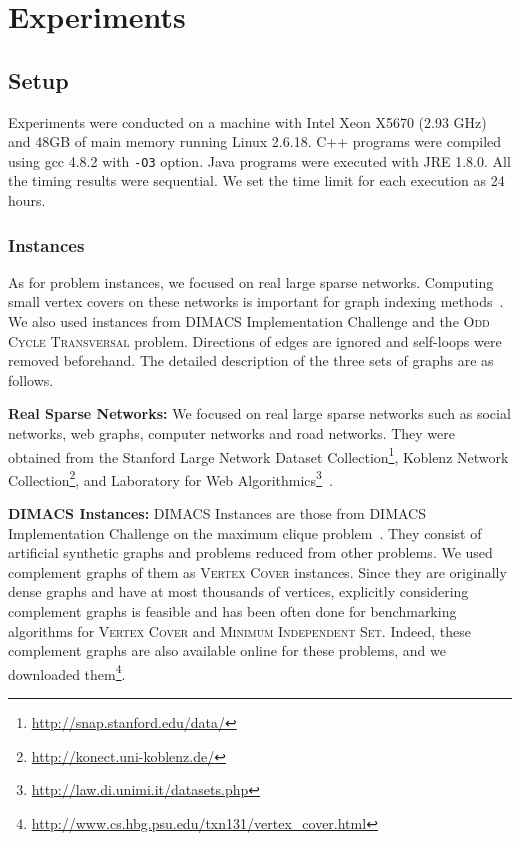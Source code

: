 \documentclass[11pt]{article}
\newcommand{\OCT}{\textsc{Odd Cycle Transversal}\xspace}
\newcommand{\myparagraph}[1]{\vspace{1em}\noindent\textbf{#1:}}
\begin{document}
 \section{Experiments}\label{sec:experiments}
\subsection{Setup}
Experiments were conducted on a machine with Intel
Xeon X5670 (2.93 GHz) and 48GB of main memory
running Linux 2.6.18.
C++ programs were compiled using gcc 4.8.2 with \texttt{-O3} option.
Java programs were executed with JRE 1.8.0.
All the timing results were sequential.
We set the time limit for each execution as 24 hours.


\subsubsection{Instances}
As for problem instances, we focused on real large sparse networks.
Computing small vertex covers on these networks
is important for graph indexing methods~\cite{app/vc_index,app/k-path}.
We also used instances from DIMACS Implementation Challenge and the \OCT problem.
Directions of edges are ignored and self-loops were removed beforehand.
The detailed description of the three sets of graphs are as follows.

\myparagraph{Real Sparse Networks} We focused on real large sparse networks
such as social networks, web graphs, computer networks and road networks.
They were obtained from the Stanford Large Network Dataset Collection\footnote{\url{http://snap.stanford.edu/data/}}, Koblenz Network Collection\footnote{\url{http://konect.uni-koblenz.de/}}, and Laboratory for Web Algorithmics\footnote{\url{http://law.di.unimi.it/datasets.php}}~\cite{datasets/webgraph1,datasets/webgraph2}.

\myparagraph{DIMACS Instances}
DIMACS Instances are those from DIMACS Implementation Challenge on the maximum clique problem~\cite{datasets/dimacs}.
They consist of artificial synthetic graphs and problems reduced from other problems.
We used complement graphs of them as \textsc{Vertex Cover} instances.
Since they are originally dense graphs and have at most thousands of vertices,
explicitly considering complement graphs is feasible
and has been often done for benchmarking algorithms for
\textsc{Vertex Cover} and \textsc{Minimum Independent Set}.
Indeed, these complement graphs are also available online for these problems,
and we downloaded them\footnote{\url{http://www.cs.hbg.psu.edu/txn131/vertex_cover.html}}.
\end{document}
